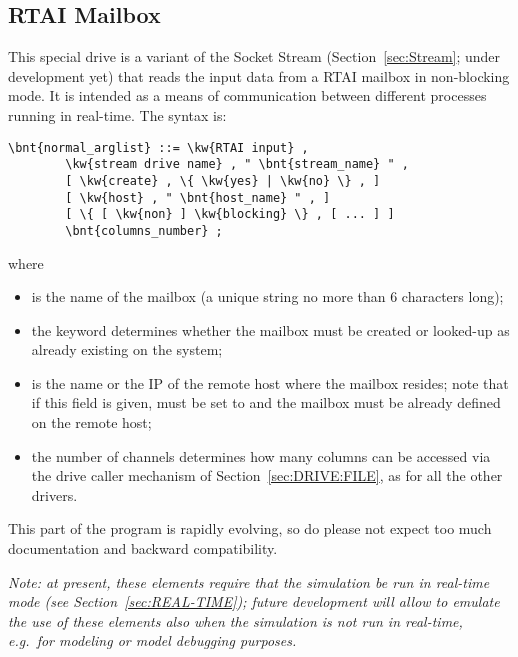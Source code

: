 \subsection{RTAI Mailbox}\label{sec:RTAI_in}
This special drive is a variant of the Socket Stream
(Section~\ref{sec:Stream}; under development yet)
that reads the input data from a RTAI mailbox in non-blocking mode.
It is intended as a means of communication between different processes
running in real-time.
The syntax is:
\begin{Verbatim}[commandchars=\\\{\}]
    \bnt{normal_arglist} ::= \kw{RTAI input} ,
        \kw{stream drive name} , " \bnt{stream_name} " ,
        [ \kw{create} , \{ \kw{yes} | \kw{no} \} , ]
        [ \kw{host} , " \bnt{host_name} " , ]
        [ \{ [ \kw{non} ] \kw{blocking} \} , [ ... ] ]
        \bnt{columns_number} ;
\end{Verbatim}
where
\begin{itemize}
\item {} is the name of the mailbox (a unique string 
no more than 6 characters long);
\item the  keyword determines whether the mailbox 
must be created or looked-up as already existing on the system;
\item {} is the name or the IP of the remote host where 
the mailbox resides; note that if this field is given,  must
be set to  and the mailbox must be already defined
on the remote host;
\item the number of channels  determines how many
columns can be accessed via the  drive caller mechanism 
of Section~\ref{sec:DRIVE:FILE}, as for all the other  drivers.
\end{itemize}
This part of the program is rapidly evolving, so do please not expect
too much documentation and backward compatibility.

\emph{Note: at present, these elements require that the simulation
be run in real-time mode (see Section~\ref{sec:REAL-TIME});
future development will allow to emulate the use of these elements
also when the simulation is not run in real-time, e.g.\ for modeling
or model debugging purposes.}



